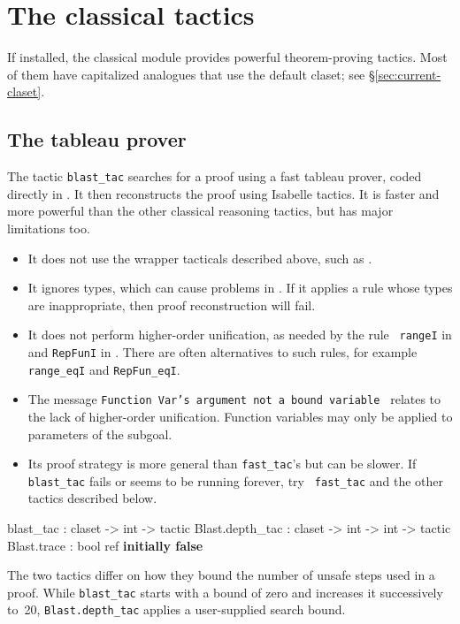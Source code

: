 \section{The classical tactics}
 If installed, the classical module provides
powerful theorem-proving tactics.  Most of them have capitalized analogues
that use the default claset; see \S\ref{sec:current-claset}.


\subsection{The tableau prover}
The tactic \texttt{blast_tac} searches for a proof using a fast tableau prover,
coded directly in \ML.  It then reconstructs the proof using Isabelle
tactics.  It is faster and more powerful than the other classical
reasoning tactics, but has major limitations too.
\begin{itemize}
\item It does not use the wrapper tacticals described above, such as
  .
\item It ignores types, which can cause problems in \HOL.  If it applies a rule
  whose types are inappropriate, then proof reconstruction will fail.
\item It does not perform higher-order unification, as needed by the rule {\tt
    rangeI} in {\HOL} and \texttt{RepFunI} in {\ZF}.  There are often
    alternatives to such rules, for example {\tt
    range_eqI} and \texttt{RepFun_eqI}.
\item The message {\small\tt Function Var's argument not a bound variable\ }
relates to the lack of higher-order unification.  Function variables
may only be applied to parameters of the subgoal.
\item Its proof strategy is more general than \texttt{fast_tac}'s but can be
  slower.  If \texttt{blast_tac} fails or seems to be running forever, try {\tt
  fast_tac} and the other tactics described below.
\end{itemize}
%
\begin{ttbox} 
blast_tac        : claset -> int -> tactic
Blast.depth_tac  : claset -> int -> int -> tactic
Blast.trace      : bool ref \hfill{\bf initially false}
\end{ttbox}
The two tactics differ on how they bound the number of unsafe steps used in a
proof.  While \texttt{blast_tac} starts with a bound of zero and increases it
successively to~20, \texttt{Blast.depth_tac} applies a user-supplied search bound.
